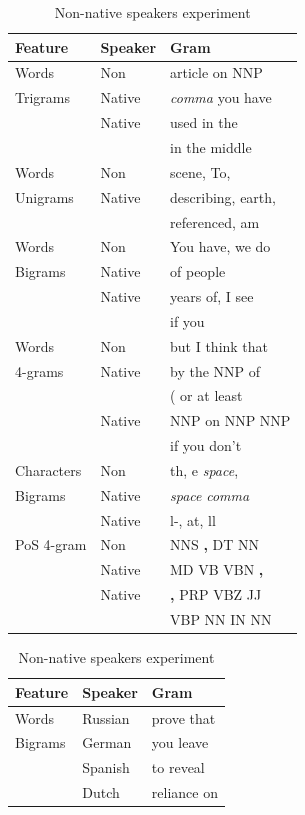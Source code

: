 \documentclass[10pt,a5paper,twoside]{article}
\begin{document}
\begin{table}[t]
  \begin{subtable}[]{0.5\textwidth}
    \begin{tabular}{l|ll|}
     \textbf{Feature} & \textbf{Speaker}  & \textbf{Gram}
     \\\hline
     Words & Non&article on NNP\\
     Trigrams& Native&  \emph{comma} you have\\\cline{2-3}
             & Native& used in the\\
             &  &in the middle\\\hline
       Words &Non& scene, To,\\
     Unigrams&Native&describing, earth,\\\cline{2-3}
             && referenced, am\\\hline
      Words  &Non& You have, we do\\
      Bigrams&Native& of people\\\cline{2-3}
             &Native& years of, I see\\
             &&if you\\\hline
       Words &Non& but I think that\\
     4-grams  &Native&by the NNP of\\\cline{2-3}
              &&( or at least\\
              &Native&NNP on NNP NNP\\
              &&if you don't\\\hline
    Characters&Non& th, e \emph{space},\\
         Bigrams &Native& \emph{space} \emph{comma}\\ \cline{2-3}
                 &Native& l-, at, ll\\\hline
      PoS 4-gram &Non& NNS \textbf{,} DT NN\\
                 &Native& MD VB VBN \textbf{,}\\\cline{2-3}
                 &Native& \textbf{,} PRP VBZ JJ\\
                 && VBP NN IN NN\\
      \end{tabular}
    \caption{Non-native speakers experiment}
    \label{table:nonnative}
  \end{subtable}
  \begin{subtable}[]{0.5\textwidth}
   \begin{tabular}{l|ll}
    \textbf{Feature} & \textbf{Speaker}  & \textbf{Gram}
   \\\hline
   Words & Russian &prove that\\
    Bigrams& German& you leave\\
    & Spanish& to reveal\\
    & Dutch & reliance on\\\hline


\end{tabular}
\end{subtable}
\end{table}
\end{document}
